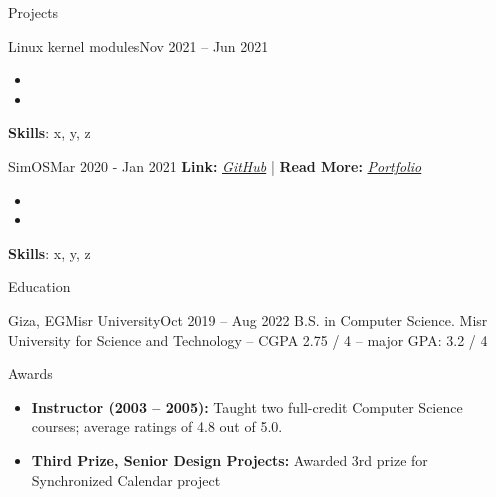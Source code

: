 \documentclass[]{Sohaib-Mohamed}
\begin{document}
\begin{cvsection}{Projects}
\begin{cvsubsection}{Linux kernel modules}{}{Nov 2021 -- Jun 2021}
\begin{itemize}
         \item
         \item
      \end{itemize}
      \textbf{Skills}: x, y, z
   \end{cvsubsection}
   \begin{cvsubsection}{SimOS}{}{Mar 2020 - Jan 2021}
      \textbf{Link:} \href{https://github.com/smalinux/simOS}{\textit{GitHub}} | \textbf{Read More:} \href{https://gist.github.com/smalinux/2e9c5537fdac65501a655280352c9c15#simos}{\textit{Portfolio}}
      \begin{itemize}
         \item
         \item
      \end{itemize}
      \textbf{Skills}: x, y, z
   \end{cvsubsection}
\end{cvsection}

\begin{cvsection}{Education}
   \begin{cvsubsection}{Giza, EG}{Misr University}{Oct 2019 -- Aug 2022}
      B.S. in Computer Science. Misr University for Science and Technology -- CGPA 2.75 / 4 -- major GPA: 3.2 / 4
   \end{cvsubsection}
\end{cvsection}

\begin{cvsection}{Awards}
   \begin{cvsubsection}{}{}{}
      \begin{itemize}
         \item \textbf{Instructor (2003 – 2005):} Taught two full-credit Computer Science courses; average ratings of 4.8 out of 5.0.
         \item \textbf{Third Prize, Senior Design Projects:} Awarded 3rd prize for Synchronized Calendar project
      \end{itemize}
   \end{cvsubsection}
\end{cvsection}
\end{document}
